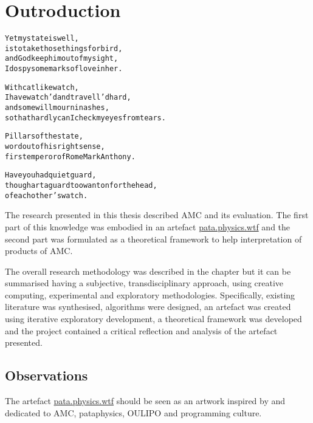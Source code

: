
\chapter{Outroduction}
\label{ch:observations}

\startcontents[chapters]

\vfill

\begin{alltt}\sffamily
Yet my state is well,
is to take those things for bird,
and God keep him out of my sight,
I do spy some marks of love in her.

With catlike watch,
I have watch'd and travell'd hard,
and some will mourn in ashes,
so that hardly can I check my eyes from tears.

Pillars of the state,
word out of his right sense,
first emperor of Rome Mark Anthony.

Have you had quiet guard,
though art a guard too wanton for the head,
of each other's watch.
\end{alltt}

\newpage
\minicontents
\spirals


The research presented in this thesis described \acf{AMC} and its evaluation. The first part of this knowledge was embodied in an artefact \url{pata.physics.wtf} and the second part was formulated as a theoretical framework to help interpretation of products of \ac{AMC}.

The overall research methodology was described in the  chapter but it can be summarised having a subjective, transdisciplinary approach, using creative computing, experimental and exploratory methodologies. Specifically, existing literature was synthesised\marginpar{\textspiral~\ref{p:lit}}, algorithms were designed, an artefact was created using iterative exploratory development\marginpar{\textspiral~\ref{p:practice}}, a theoretical framework was developed \marginpar{\textspiral~\ref{p:theory}} and the project contained a critical reflection and analysis of the artefact presented\marginpar{\textspiral~\ref{p:analysis}}. 


\section{Observations}

The artefact \url{pata.physics.wtf} should be seen as an artwork inspired by and dedicated to \ac{AMC}, pataphysics, \ac{OULIPO} and programming culture.

